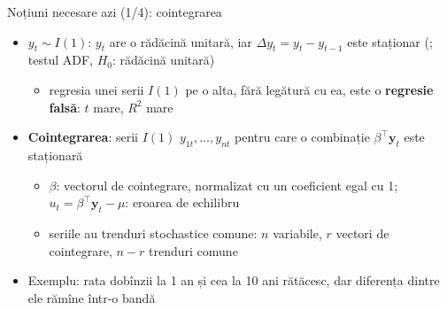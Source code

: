 \begin{frame}{Noțiuni necesare azi (1/4): cointegrarea}
\itemsize{\small}
\begin{itemize}
    \item $y_t \sim I(1)$: $y_t$ are o rădăcină unitară, iar $\Delta y_t = y_t - y_{t-1}$ este staționar (; testul ADF, $H_0$: rădăcină unitară)
    \begin{itemize}
        \item regresia unei serii $I(1)$ pe o alta, fără legătură cu ea, este o \textbf{regresie falsă}: $t$ mare, $R^2$ mare
    \end{itemize}
    \item \textbf{Cointegrarea}: serii $I(1)$ $y_{1t}, \dots, y_{nt}$ pentru care o combinație $\beta^\top\mathbf y_t$ este staționară
    \begin{itemize}
        \item $\beta$: vectorul de cointegrare, normalizat cu un coeficient egal cu 1; $u_t = \beta^\top\mathbf y_t - \mu$: eroarea de echilibru
        \item seriile au trenduri stochastice comune: $n$ variabile, $r$ vectori de cointegrare, $n - r$ trenduri comune
    \end{itemize}
    \item Exemplu: rata dobînzii la 1 an și cea la 10 ani rătăcesc, dar diferența dintre ele rămîne într-o bandă
\end{itemize}
\end{frame}

